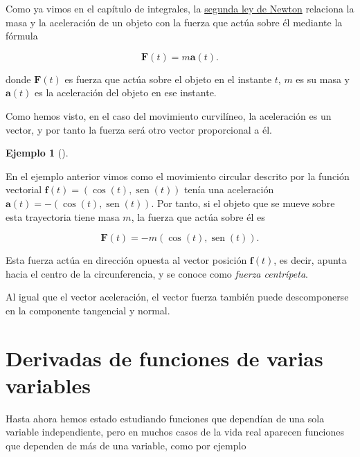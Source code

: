 \documentclass[
  a4paper,
]{scrreport}
\theoremstyle{definition}
\theoremstyle{plain}
\theoremstyle{plain}
\theoremstyle{definition}
\theoremstyle{definition}
\newtheorem{example}{Ejemplo}[chapter]
\theoremstyle{plain}
\theoremstyle{remark}
\begin{document}
Como ya vimos en el capítulo de integrales, la
\href{https://es.wikipedia.org/wiki/Leyes_de_Newton\#Segunda_ley_de_Newton_o_ley_fundamental_de_la_din\%C3\%A1mica}{segunda
ley de Newton} relaciona la masa y la aceleración de un objeto con la
fuerza que actúa sobre él mediante la fórmula

\[
\mathbf{F}(t) = m\mathbf{a}(t).
\]

donde \(\mathbf{F}(t)\) es fuerza que actúa sobre el objeto en el
instante \(t\), \(m\) es su masa y \(\mathbf{a}(t)\) es la aceleración
del objeto en ese instante.

Como hemos visto, en el caso del movimiento curvilíneo, la aceleración
es un vector, y por tanto la fuerza será otro vector proporcional a él.

\begin{example}[]\protect\hypertarget{exm-fuerza-centrípeta}{}\label{exm-fuerza-centrípeta}

En el ejemplo anterior vimos como el movimiento circular descrito por la
función vectorial \(\mathbf{f}(t) = (\cos(t),\operatorname{sen}(t))\)
tenía una aceleración
\(\mathbf{a}(t) = -(\cos(t), \operatorname{sen}(t))\). Por tanto, si el
objeto que se mueve sobre esta trayectoria tiene masa \(m\), la fuerza
que actúa sobre él es

\[
\mathbf{F}(t) = -m(\cos(t), \operatorname{sen}(t)).
\]

Esta fuerza actúa en dirección opuesta al vector posición
\(\mathbf{f}(t)\), es decir, apunta hacia el centro de la
circunferencia, y se conoce como \emph{fuerza centrípeta}.

\end{example}

Al igual que el vector aceleración, el vector fuerza también puede
descomponerse en la componente tangencial y normal.


\hypertarget{derivadas-de-funciones-de-varias-variables}{%
\chapter{Derivadas de funciones de varias
variables}\label{derivadas-de-funciones-de-varias-variables}}

Hasta ahora hemos estado estudiando funciones que dependían de una sola
variable independiente, pero en muchos casos de la vida real aparecen
funciones que dependen de más de una variable, como por ejemplo
\end{document}
